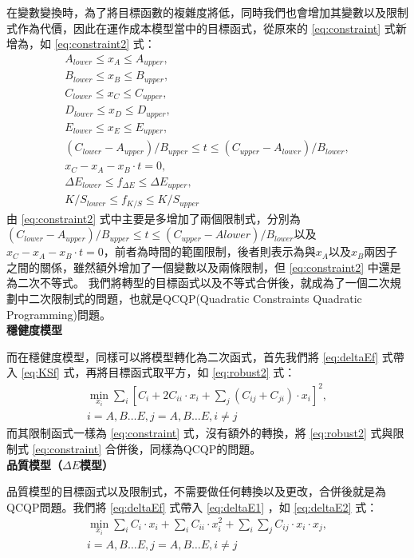 在變數變換時，為了將目標函數的複雜度將低，同時我們也會增加其變數以及限制式作為代價，因此在運作成本模型當中的目標函式，從原來的 \ref{eq:constraint} 式新增為，如 \ref{eq:constraint2} 式：
\begin{equation}
	\begin{array}{c}
	A_{lower} \leq x_A \leq A_{upper},\\
	B_{lower} \leq x_B \leq B_{upper},\\
	C_{lower} \leq x_C \leq C_{upper},\\
	D_{lower} \leq x_D \leq D_{upper},\\
	E_{lower} \leq x_E \leq E_{upper},\\
	(C_{lower}-A_{upper})/B_{upper} \leq t \leq (C_{upper}-A_{lower})/B_{lower},\\
	x_C-x_A-x_B\cdot t = 0,\\
	\Delta E_{lower} \leq f_{\Delta E} \leq \Delta E_{upper},\\
	K/S_{lower} \leq f_{K/S} \leq K/S_{upper}
	\end{array}
\label{eq:constraint2}
\end{equation}
由 \ref{eq:constraint2} 式中主要是多增加了兩個限制式，分別為$(C_{lower}-A_{upper})/B_{upper} \leq t \leq (C_{upper}-A{lower})/B_{lower}$以及$x_C-x_A-x_B\cdot t = 0$，前者為時間的範圍限制，後者則表示為與$x_A$以及$x_B$兩因子之間的關係，雖然額外增加了一個變數以及兩條限制，但 \ref{eq:constraint2} 中還是為二次不等式。
我們將轉型的目標函式以及不等式合併後，就成為了一個二次規劃中二次限制式的問題，也就是QCQP(Quadratic Constraints Quadratic Programming)問題。
\\\textbf{穩健度模型}

而在穩健度模型，同樣可以將模型轉化為二次函式，首先我們將 \ref{eq:deltaEf} 式帶入 \ref{eq:KSf} 式，再將目標函式取平方，如 \ref{eq:robust2} 式：
\begin{equation}
	\begin{array}{c}
	\min_{x_i} \sum_{i}[C_{i}+2C_{ii}\cdot x_i+\sum_j(C_{ij}+C_{ji})\cdot x_i]^{2},\\i=A,B\dots E,j=A,B\dots E , i\neq j
	\end{array}
\label{eq:robust2}
\end{equation}
而其限制函式一樣為 \ref{eq:constraint} 式，沒有額外的轉換，將 \ref{eq:robust2} 式與限制式 \ref{eq:constraint} 合併後，同樣為QCQP的問題。
\\\textbf{品質模型（$\Delta E$模型）}

品質模型的目標函式以及限制式，不需要做任何轉換以及更改，合併後就是為QCQP問題。我們將 \ref{eq:deltaEf} 式帶入 \ref{eq:deltaE1} ，如 \ref{eq:deltaE2} 式：
\begin{equation}
	\begin{array}{c}
	\min_{x_i}\sum_i C_i\cdot x_i + \sum_i C_{ii}\cdot x_i^2+\sum_i\sum_j C_{ij}\cdot x_{i}\cdot x_{j},\\i=A,B\dots E,j=A,B\dots E , i\neq j
	\end{array}
\label{eq:deltaE2}
\end{equation}
